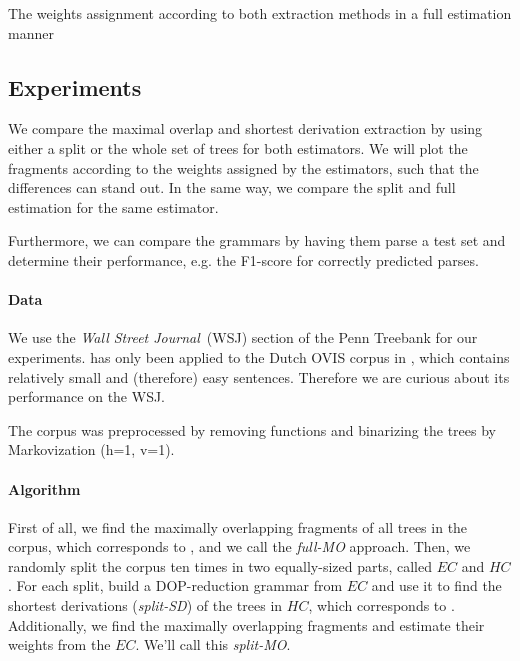 \begin{table}[h!]
\center

\caption{The weights assignment according to both extraction methods in a full estimation manner}
\label{t:weights}
\end{table}





\subsection{Experiments}





We compare the maximal overlap and shortest derivation extraction by using either a split or the whole set of trees for both estimators. We will plot the fragments according to the weights assigned by the estimators, such that the differences can stand out. In the same way, we compare the split and full estimation for the same estimator.

Furthermore, we can compare the grammars by having them parse a test set and determine their performance, e.g. the F1-score for correctly predicted parses.

\paragraph{Data}
We use the \emph{Wall Street Journal}~(WSJ) section of the Penn Treebank for our experiments. \dops{} has only been applied to the Dutch OVIS corpus in \cite{zollmann2005}, which contains relatively small and (therefore) easy sentences. Therefore we are curious about its performance on the WSJ.

The corpus was preprocessed by removing functions and binarizing the trees by Markovization (h=1, v=1). 

\paragraph{Algorithm}
First of all, we find the maximally overlapping fragments of all trees in the corpus, which corresponds to \ddop, and we call the \emph{full-MO} approach.
Then, we randomly split the corpus ten times in two equally-sized parts, called $EC$ and $HC$. For each split, build a DOP-reduction grammar from $EC$ and use it to find the shortest derivations (\emph{split-SD}) of the trees in $HC$, which corresponds to \dops{}. Additionally, we find the maximally overlapping fragments and estimate their weights from the $EC$. We'll call this \emph{split-MO}.

